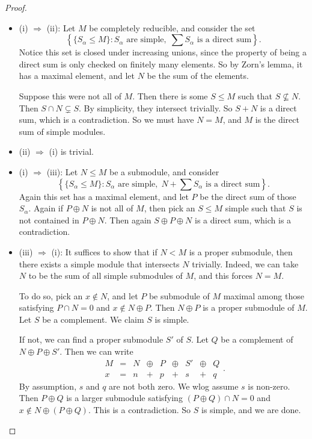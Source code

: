 \documentclass[a4paper]{article}
\begin{document}
\begin{proof}\leavevmode
  \begin{itemize}
    \item (i) $\Rightarrow$ (ii): Let $M$ be completely reducible, and consider the set
      \[
        \left\{\{S_\alpha \leq M\} : S_\alpha\text{ are simple},\; \sum S_\alpha\text{ is a direct sum}\right\}.
      \]
      Notice this set is closed under increasing unions, since the property of being a direct sum is only checked on finitely many elements. So by Zorn's lemma, it has a maximal element, and let $N$ be the sum of the elements.

      Suppose this were not all of $M$. Then there is some $S \leq M$ such that $S \not\subseteq N$. Then $S \cap N \subsetneq S$. By simplicity, they intersect trivially. So $S + N$ is a direct sum, which is a contradiction. So we must have $N = M$, and $M$ is the direct sum of simple modules.
    \item (ii) $\Rightarrow$ (i) is trivial.
    \item (i) $\Rightarrow$ (iii): Let $N \leq M$ be a submodule, and consider
      \[
        \left\{\{S_\alpha \leq M\} : S_\alpha\text{ are simple},\; N + \sum S_\alpha\text{ is a direct sum}\right\}.
      \]
      Again this set has a maximal element, and let $P$ be the direct sum of those $S_\alpha$. Again if $P \oplus N$ is not all of $M$, then pick an $S \leq M$ simple such that $S$ is not contained in $P \oplus N$. Then again $S \oplus P \oplus N$ is a direct sum, which is a contradiction.
    \item (iii) $\Rightarrow$ (i): It suffices to show that if $N < M$ is a proper submodule, then there exists a simple module that intersects $N$ trivially. Indeed, we can take $N$ to be the sum of all simple submodules of $M$, and this forces $N = M$.

      To do so, pick an $x \not \in N$, and let $P$ be submodule of $M$ maximal among those satisfying $P \cap N = 0$ and $x \not \in N \oplus P$. Then $N \oplus P$ is a proper submodule of $M$. Let $S$ be a complement. We claim $S$ is simple.

      If not, we can find a proper submodule $S'$ of $S$. Let $Q$ be a complement of $N \oplus P \oplus S'$. Then we can write
      \[
        \begin{array}{ccccccccc}
          M &=& N &\oplus& P &\oplus& S' &\oplus& Q\\
          x &=& n &+& p &+& s&+& q
        \end{array}.
      \]
      By assumption, $s$ and $q$ are not both zero. We wlog assume $s$ is non-zero. Then $P \oplus Q$ is a larger submodule satisfying $(P \oplus Q) \cap N = 0$ and $x \not \in N \oplus (P \oplus Q)$. This is a contradiction. So $S$ is simple, and we are done.
  \end{itemize}
\end{proof}
\end{document}

